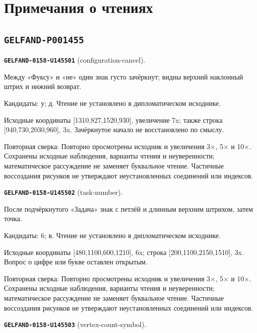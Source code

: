 \section*{Примечания о чтениях}
\subsection*{\texttt{GELFAND-P001455}}
\par\noindent\leavevmode{}\label{GELFAND-0158-U145501}\label{GELFAND-P001455:configuration-cancel}\textbf{\texttt{GELFAND-0158-U145501}} (configuration-cancel).\nopagebreak[4]\par
Между «Фуксу» и «не» один знак густо зачёркнут; видны верхний наклонный штрих и нижний возврат.\par
Кандидаты: у; д. Чтение не установлено в дипломатическом исходнике.\par
Исходные координаты [1310,827,1520,930], увеличение 7x; также строка [940,730,2030,960], 3x. Зачёркнутое начало не восстановлено по смыслу.\par
Повторная сверка: Повторно просмотрены исходник и увеличения 3×, 5× и 10×. Сохранены исходные наблюдения, варианты чтения и неуверенности; математическое рассуждение не заменяет буквальное чтение. Частичные воссоздания рисунков не утверждают неустановленных соединений или индексов.\par\medskip
\par\noindent\leavevmode{}\label{GELFAND-0158-U145502}\label{GELFAND-P001455:task-number}\textbf{\texttt{GELFAND-0158-U145502}} (task-number).\nopagebreak[4]\par
После подчёркнутого «Задача» знак с петлёй и длинным верхним штрихом, затем точка.\par
Кандидаты: 6; в. Чтение не установлено в дипломатическом исходнике.\par
Исходные координаты [480,1100,600,1210], 6x; строка [200,1100,2150,1510], 3x. Вопрос о цифре или букве оставлен открытым.\par
Повторная сверка: Повторно просмотрены исходник и увеличения 3×, 5× и 10×. Сохранены исходные наблюдения, варианты чтения и неуверенности; математическое рассуждение не заменяет буквальное чтение. Частичные воссоздания рисунков не утверждают неустановленных соединений или индексов.\par\medskip
\par\noindent\leavevmode{}\label{GELFAND-0158-U145503}\label{GELFAND-P001455:vertex-count-symbol}\textbf{\texttt{GELFAND-0158-U145503}} (vertex-count-symbol).\nopagebreak[4]\par
